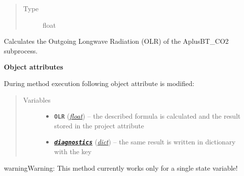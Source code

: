 \documentclass[letterpaper,10pt,english]{sphinxmanual}
\begin{document}
\begin{fulllineitems}
\begin{fulllineitems}
\begin{quote}
\begin{description}
\begin{itemize}
\end{itemize}

\item[{Type}] \leavevmode
float

\end{description}\end{quote}

\end{fulllineitems}


\begin{fulllineitems}
\label{api/climlab.radiation:climlab.radiation.AplusBT.AplusBT_CO2.emission}
Calculates the Outgoing Longwave Radiation (OLR) of the AplusBT\_CO2
subprocess.

\textbf{Object attributes}

During method execution following object attribute is modified:
\begin{quote}\begin{description}
\item[{Variables}] \leavevmode\begin{itemize}
\item {} 
\textbf{\texttt{OLR}} (\href{http://docs.python.org/2.7/library/functions.html\#float}{\emph{float}}) -- the described formula is calculated and the
result stored in the project attribute 

\item {} 
{\hyperref[api/climlab.process:climlab.process.process.Process.diagnostics]{\emph{\textbf{\texttt{diagnostics}}}}} (\href{http://docs.python.org/2.7/library/stdtypes.html\#dict}{\emph{dict}}) -- the same result is written in  
dictionary with the key 

\end{itemize}

\end{description}\end{quote}

\begin{notice}{warning}{Warning:}
This method currently works only for a single state variable!
\end{notice}

\end{fulllineitems}


\end{fulllineitems}
\end{document}
